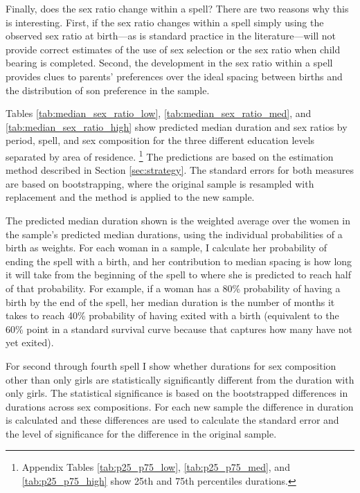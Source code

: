 \documentclass[12pt,letterpaper]{article}
\begin{document}
Finally, does the sex ratio change within a spell?
There are two reasons why this is interesting.
First, if the sex ratio changes within a spell simply using the observed sex
ratio at birth---as is standard practice in the literature---will not provide
correct estimates of the use of sex selection or the sex ratio when child
bearing is completed.
Second, the development in the sex ratio within a spell provides clues
to parents' preferences over the ideal spacing between births and the
distribution of son preference in the sample.


Tables \ref{tab:median_sex_ratio_low}, \ref{tab:median_sex_ratio_med}, and
\ref{tab:median_sex_ratio_high}
show predicted median duration and sex ratios by period, spell, and sex 
composition for the three different education levels separated by area of residence.%
\footnote{
Appendix Tables \ref{tab:p25_p75_low}, \ref{tab:p25_p75_med}, and 
\ref{tab:p25_p75_high} show 25th and 75th percentiles durations.
} 
The predictions are based on the estimation method described in 
Section \ref{sec:strategy}.
The standard errors for both measures are based on bootstrapping, where the 
original sample is resampled with replacement and the method is applied to 
the new sample.

The predicted median duration shown is the weighted average over the women in the 
sample's predicted median durations, using the individual probabilities of a birth 
as weights.
For each woman in a sample, I calculate her probability of ending the spell 
with a birth, and her contribution to median spacing is how long it will take
from the beginning of the spell to where she is predicted to reach half of that probability.
For example, if a woman has a 80\% probability of having a birth by the end of 
the spell, her median duration is the number of months it takes to reach
40\% probability of having exited with a birth (equivalent to the 60\% point
in a standard survival curve because that captures how many have not yet
exited).

For second through fourth spell I show whether durations for sex composition
other than only girls are statistically significantly different from the
duration with only girls.
The statistical significance is based on the bootstrapped differences in
durations across sex compositions.
For each new sample the difference in duration is calculated and these
differences are used to calculate the standard error and the level of
significance for the difference in the original sample.
 
\end{document}
